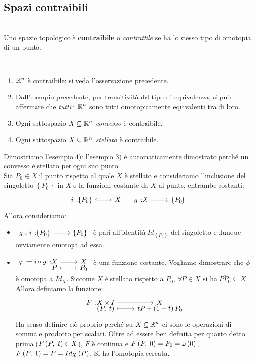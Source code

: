 \subsection{Spazi contraibili}
\begin{define}~{}\\
	Uno spazio topologico è \textbf{contraibile} o \textit{contrattile} se ha lo stesso tipo di omotopia di un punto.
\end{define}
\begin{examples}~{}
	\begin{enumerate}
		\item $\mathbb{R}^n$ è contraibile: si veda l'osservazione precedente.
		\item Dall'esempio precedente, per transitività del tipo di equivalenza, si può affermare che \textit{tutti} i $\mathbb{R}^n$ sono tutti omotopicamente equivalenti tra di loro.
		\item Ogni sottospazio $X\subseteq \mathbb{R}^n$ \textit{convesso} è contraibile.
		\item Ogni sottospazio $X\subseteq \mathbb{R}^n$ \textit{stellato} è contraibile.
	\end{enumerate}
\vspace{-3mm}
\end{examples}
\begin{demonstration}
	Dimostriamo l'esempio $4)$: l'esempio $3)$ è automaticamente dimostrato perché un convesso è stellato per ogni suo punto.\\
	Sia $P_0\in X$ il punto rispetto al quale $X$ è stellato e consideriamo l'inclusione del singoletto $\left\{P_0\right\}$ in $X$ e la funzione costante da $X$ al punto, entrambe costanti:
	\begin{equation*}
		\incl{i}{\left\{P_0\right\}}{X}\quad \funz{g}{X}{\left\{P_0\right\}}
	\end{equation*}
Allora consideriamo:
\begin{itemize}
	\item $\funz{g\circ i}{\left\{P_0\right\}}{\left\{P_0\right\}}$ è pari all'identità $Id_{\left\{P_0\right\}}$ del singoletto e dunque ovviamente omotopa ad essa.
	\item $\funztot{\phi\coloneqq i\circ g}{X}{X}{P}{P_0}$ è una funzione costante. Vogliamo dimostrare che $\phi$ è omotopa a $Id_X$. Siccome $X$ è stellato rispetto a $P_0$, $\forall P\in X$ si ha $\overline{PP_0}\subseteq X$. Allora definiamo la funzione:
	\begin{equation*}
		\funztot{F}{X\times I}{X}{\left(P,\ t\right)}{tP+\left(1-t\right)P_0}
	\end{equation*}
Ha senso definire ciò proprio perché su $X\subseteq \mathbb{R}^n$ ci sono le operazioni di somma e prodotto per scalari. Oltre ad essere ben definita per quanto detto prima ($F\left(P,\ t\right)\in X$), $F$ è continua e $F\left(P,\ 0\right)=P_0=\varphi\left(0\right)$, $F\left(P,\ 1\right)=P=Id_X\left(P\right)$. Si ha l'omotopia cercata.
\end{itemize}
\vspace{-3mm}
\end{demonstration}
